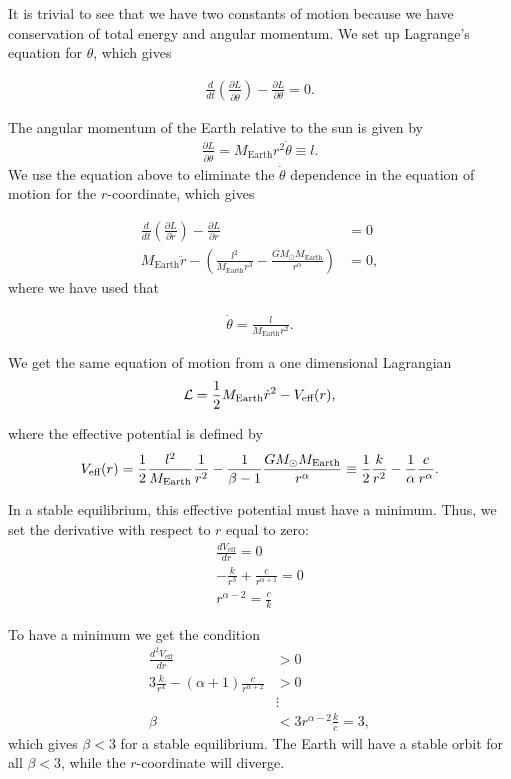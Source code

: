 \documentclass[../main.tex]{subfiles}
\begin{document}
It is trivial to see that we have two constants of motion because we have conservation of total energy and angular momentum. We set up Lagrange's equation for $\theta$, which gives

\begin{align*}
    \frac{d}{dt}\left(\frac{\partial L}{\partial \dot{\theta}}\right)-\frac{\partial L}{\partial \theta} = 0.
\end{align*}

The angular momentum of the Earth relative to the sun is given by
\begin{align*}
    \frac{\partial L}{\partial \dot{\theta}}= M_{\text{Earth}}r^2\dot{\theta}\equiv l.
\end{align*} We use the equation above to eliminate the \ensuremath{\dot{\theta}} dependence in the equation of motion for the \ensuremath{r}-coordinate, which gives 

\begin{align*}
    \frac{d}{dt}\left(\frac{\partial L}{\partial \dot{r}}\right)-\frac{\partial L}{\partial r} &= 0 \\
    M_{\text{Earth}}\ddot{r}-\left(\frac{l^2}{M_{\text{Earth}}r^3}-\frac{GM_{\odot}M_{\text{Earth}}}{r^{\alpha}}\right) &= 0,
\end{align*} where we have used that

\begin{align*}
    \dot{\theta}=\frac{l}{M_{\text{Earth}}r^2}.
\end{align*}

We get the same equation of motion from a one dimensional Lagrangian
\begin{align*}
    \mathcal{L}=\frac{1}{2}M_{\text{Earth}}\dot{r}^2-V_{\textnormal{eff}}(r), 
\end{align*}

where the effective potential is defined by 
\begin{align*}
    V_{\textnormal{eff}}(r)=\frac{1}{2}\frac{l^2}{M_{\text{Earth}}}\frac{1}{r^2}-\frac{1}{\beta-1}\frac{GM_{\odot}M_{\text{Earth}}}{r^{\alpha}} \equiv \frac{1}{2}\frac{k}{r^2}-\frac{1}{\alpha}\frac{c}{r^{\alpha}}.
\end{align*}

In a stable equilibrium, this effective potential must have a minimum. Thus, we set the derivative with respect to \ensuremath{r} equal to zero: 
\begin{align*}
    \frac{dV_{\text{eff}}}{dr}=0 \\
    -\frac{k}{r^3}+\frac{c}{r^{\alpha+1}}=0 \\
    r^{\alpha-2}=\frac{c}{k}
\end{align*}

To have a minimum we get the condition 
\begin{align*}
    \frac{d^2V_{\text{eff}}}{dr}&>0 \\
    3\frac{k}{r^4}-(\alpha+1)\frac{c}{r^{\alpha+2}}&>0 \\
    &\vdots \\
    \beta &< 3r^{\alpha-2}\frac{k}{c} = 3,    
\end{align*}  which gives \ensuremath{\beta < 3} for a stable equilibrium. The Earth will have a stable orbit for all \ensuremath{\beta<3}, while the \ensuremath{r}-coordinate will diverge. 
\end{document}
